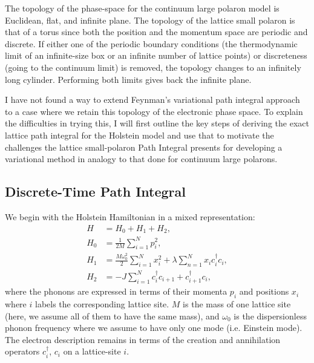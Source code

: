 The topology of the phase-space for the continuum large polaron model is Euclidean, flat, and infinite plane. The topology of the lattice small polaron is that of a torus since both the position and the momentum space are periodic and discrete. If either one of the periodic boundary conditions (the thermodynamic limit of an infinite-size box or an infinite number of lattice points) or discreteness (going to the continuum limit) is removed, the topology changes to an infinitely long cylinder. Performing both limits gives back the infinite plane.

I have not found a way to extend Feynman's variational path integral approach to a case where we retain this topology of the electronic phase space. To explain the difficulties in trying this, I will first outline the key steps of deriving the exact lattice path integral for the Holstein model and use that to motivate the challenges the lattice small-polaron Path Integral presents for developing a variational method in analogy to that done for continuum large polarons.

\subsection{Discrete-Time Path Integral}
\label{subsec:3-2-1}

We begin with the Holstein Hamiltonian in a mixed representation:
\begin{equation}
    \begin{aligned}
        H &= H_{0} + H_{1} + H_{2} , \\
        H_{0} &= \frac{1}{2M} \sum_{i=1}^N p_i^2 , \\
        H_{1} &= \frac{M \omega_0^2}{2} \sum_{i=1}^N x_i^2 + \lambda \sum_{n=1}^N x_i c^\dagger_i c_i , \\
        H_{2} &= -J \sum_{i=1}^N c^\dagger_i c_{i+1} + c_{i+1}^\dagger c_i ,
    \end{aligned}
\end{equation}
 where the phonons are expressed in terms of their momenta $p_i$ and positions $x_i$ where $i$ labels the corresponding lattice site. $M$ is the mass of one lattice site (here, we assume all of them to have the same mass), and $\omega_0$ is the dispersionless phonon frequency where we assume to have only one mode (i.e. Einstein mode). The electron description remains in terms of the creation and annihilation operators $c^\dagger_i$, $c_i$ on a lattice-site $i$.

